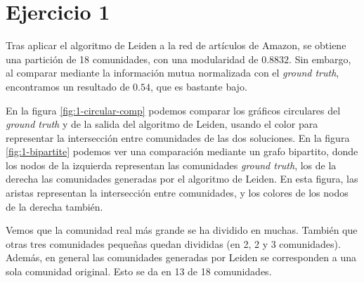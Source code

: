 \section{Ejercicio 1}\label{sec:ej1}

Tras aplicar el algoritmo de Leiden a la red de artículos de Amazon, se obtiene
una partición de 18 comunidades, con una modularidad de $0.8832$. Sin embargo,
al comparar mediante la información mutua normalizada con el \emph{ground truth},
encontramos un resultado de $0.54$, que es bastante bajo.

En la figura \ref{fig:1-circular-comp} podemos comparar los gráficos circulares
del \emph{ground truth} y de la salida del algoritmo de Leiden, usando el color
para representar la intersección entre comunidades de las dos soluciones. En la
figura \ref{fig:1-bipartite} podemos ver una comparación mediante un grafo
bipartito, donde los nodos de la izquierda representan las comunidades
\emph{ground truth}, los de la derecha las comunidades generadas por el
algoritmo de Leiden. En esta figura, las aristas representan la intersección
entre comunidades, y los colores de los nodos de la derecha también.

Vemos que la comunidad real más grande se ha dividido en muchas. También que
otras tres comunidades pequeñas quedan divididas (en 2, 2 y 3 comunidades).
Además, en general las comunidades generadas por Leiden se corresponden a una
sola comunidad original. Esto se da en 13 de 18 comunidades.

